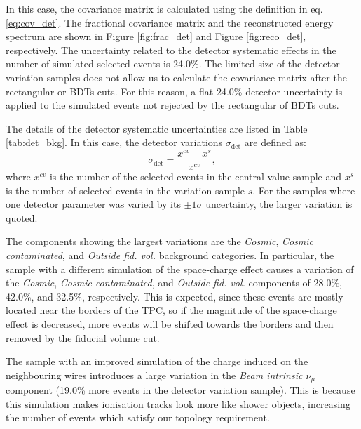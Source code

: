 In this case, the covariance matrix is calculated using the definition in eq. \eqref{eq:cov_det}. The fractional covariance matrix and the reconstructed energy spectrum are shown in Figure \ref{fig:frac_det} and Figure \ref{fig:reco_det}, respectively.
The uncertainty related to the detector systematic effects in the number of simulated selected events is 24.0\%. The limited size of the detector variation samples does not allow us to calculate the covariance matrix after the rectangular or BDTs cuts. For this reason, a flat 24.0\% detector uncertainty is applied to the simulated events not rejected by the rectangular of BDTs cuts. %

The details of the detector systematic uncertainties are listed in Table \ref{tab:det_bkg}. In this case, the detector variations $\sigma_{\mathrm{det}}$ are defined as:
\begin{equation}
    \sigma_{\mathrm{det}} = \frac{x^{cv} - x^s}{x^{cv}},
\end{equation}
where $x^{cv}$ is the number of the selected events in the central value sample and $x^s$ is the number of selected events in the variation sample $s$. For the samples where one detector parameter was varied by its $\pm1\sigma$ uncertainty, the larger variation is quoted.

The components showing the largest variations are the \emph{Cosmic}, \emph{Cosmic contaminated}, and \emph{Outside fid. vol.} background categories. In particular, the sample with a different simulation of the space-charge effect causes a variation of the \emph{Cosmic}, \emph{Cosmic contaminated}, and \emph{Outside fid. vol.} components of 28.0\%, 42.0\%, and 32.5\%, respectively. This is expected, since these events are mostly located near the borders of the TPC, so if the magnitude of the space-charge effect is decreased, more events will be shifted towards the borders and then removed by the fiducial volume cut.

The sample with an improved simulation of the charge induced on the neighbouring wires introduces a large variation in the \emph{Beam intrinsic $\nu_{\mu}$} component (19.0\% more events in the detector variation sample). This is because this simulation makes ionisation tracks look more like shower objects, increasing the number of events which satisfy our topology requirement.

